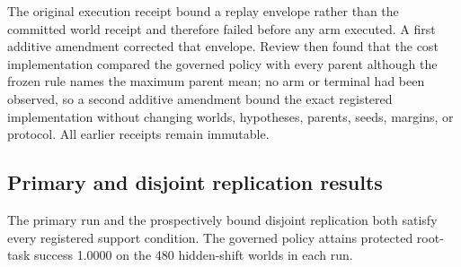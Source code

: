 The original execution receipt bound a replay envelope rather than the committed
world receipt and therefore failed before any arm executed. A first additive
amendment corrected that envelope. Review then found that the cost
implementation compared the governed policy with every parent although the
frozen rule names the maximum parent mean; no arm or terminal had been observed,
so a second additive amendment bound the exact registered implementation without
changing worlds, hypotheses, parents, seeds, margins, or protocol. All earlier
receipts remain immutable.

\subsection{Primary and disjoint replication results}

The primary run and the prospectively bound disjoint replication both satisfy
every registered support condition. The governed policy attains protected
root-task success 1.0000 on the 480 hidden-shift worlds in each run.

